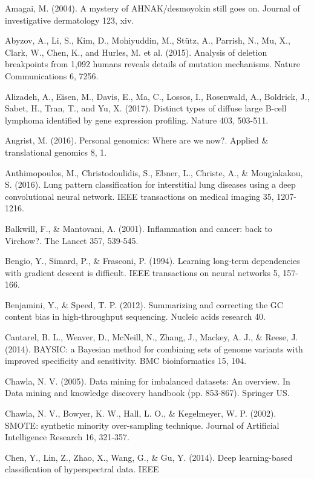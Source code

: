 \documentclass{article}
\begin{document}
\begin{list}{}{%
\setlength{\topsep}{0pt}%
\setlength{\leftmargin}{0.5in}%
\setlength{\listparindent}{-0.5in}%
\setlength{\itemindent}{-0.5in}%
\setlength{\parsep}{\parskip}%
}%
\item[]\item[] Amagai, M. (2004). A mystery of AHNAK/desmoyokin still goes on. Journal of investigative dermatology 123, xiv.\\\item[] Abyzov, A., Li, S., Kim, D., Mohiyuddin, M., Stütz, A., Parrish, N., Mu, X., Clark, W., Chen, K., and Hurles, M. et al. (2015). Analysis of deletion breakpoints from 1,092 humans reveals details of mutation mechanisms. Nature Communications 6, 7256.\\\item[] Alizadeh, A., Eisen, M., Davis, E., Ma, C., Lossos, I., Rosenwald, A., Boldrick, J., Sabet, H., Tran, T., and Yu, X. (2017). Distinct types of diffuse large B-cell lymphoma identified by gene expression profiling. Nature 403, 503-511.\\\item[] Angrist, M. (2016). Personal genomics: Where are we now?. Applied \& translational genomics 8, 1.\\\item[] Anthimopoulos, M., Christodoulidis, S., Ebner, L., Christe, A., \& Mougiakakou, S. (2016). Lung pattern classification for interstitial lung diseases using a deep convolutional neural network. IEEE transactions on medical imaging 35, 1207-1216.\\\item[] Balkwill, F., \& Mantovani, A. (2001). Inflammation and cancer: back to Virchow?. The Lancet 357, 539-545.\\\item[] Bengio, Y., Simard, P., \& Frasconi, P. (1994). Learning long-term dependencies with gradient descent is difficult. IEEE transactions on neural networks 5, 157-166.\\\item[] Benjamini, Y., \& Speed, T. P. (2012). Summarizing and correcting the GC content bias in high-throughput sequencing. Nucleic acids research 40.\\\item[] Cantarel, B. L., Weaver, D., McNeill, N., Zhang, J., Mackey, A. J., \& Reese, J. (2014). BAYSIC: a Bayesian method for combining sets of genome variants with improved specificity and sensitivity. BMC bioinformatics 15, 104.\\\item[] Chawla, N. V. (2005). Data mining for imbalanced datasets: An overview. In Data mining and knowledge discovery handbook (pp. 853-867). Springer US.\\\item[] Chawla, N. V., Bowyer, K. W., Hall, L. O., \& Kegelmeyer, W. P. (2002). SMOTE: synthetic minority over-sampling technique. Journal of Artificial Intelligence Research 16, 321-357.\\\item[] Chen, Y., Lin, Z., Zhao, X., Wang, G., \& Gu, Y. (2014). Deep learning-based classification of hyperspectral data. IEEE 
\end{list}
\end{document}
